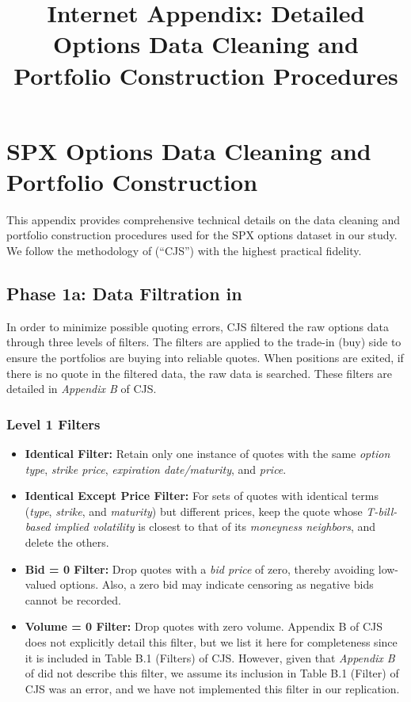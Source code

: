 \documentclass[11pt]{article}
\title{Internet Appendix: Detailed Options Data Cleaning and Portfolio Construction Procedures}
\author{}
\date{}
\begin{document}
\maketitle

\section{SPX Options Data Cleaning and Portfolio Construction}

This appendix provides comprehensive technical details on the data cleaning and portfolio construction procedures used for the SPX options dataset in our study. We follow the methodology of \citet{Constantinides2013} (``CJS'') with the highest practical fidelity.

\subsection{Phase 1a: Data Filtration in \citet{Constantinides2013}}

In order to minimize possible quoting errors, CJS filtered the raw options data through three levels of filters. The filters are applied to the trade-in (buy) side to ensure the portfolios are buying into reliable quotes. When positions are exited, if there is no quote in the filtered data, the raw data is searched. These filters are detailed in \textit{Appendix B} of CJS.



\subsubsection{Level 1 Filters}
\begin{itemize}
  \item \textbf{Identical Filter:} Retain only one instance of quotes with the same \textit{option type}, \textit{strike price}, \textit{expiration date/maturity}, and \textit{price}.
  \item \textbf{Identical Except Price Filter:} For sets of quotes with identical terms (\textit{type}, \textit{strike}, and \textit{maturity}) but different prices, keep the quote whose \textit{T-bill-based implied volatility} is closest to that of its \textit{moneyness neighbors}, and delete the others.
  \item \textbf{Bid = 0 Filter:} Drop quotes with a \textit{bid price} of zero, thereby avoiding low-valued options. Also, a zero bid may indicate censoring as negative bids cannot be recorded.
  \item \textbf{Volume = 0 Filter:} Drop quotes with zero volume. Appendix B of CJS does not explicitly detail this filter, but we list it here for completeness since it is included in Table B.1 (Filters) of CJS. However, given that \textit{Appendix B} of \citet{Constantinides2013} did not describe this filter, we assume its inclusion in Table B.1 (Filter) of CJS was an error, and we have not implemented this filter in our replication.
\end{itemize}
\end{document}
